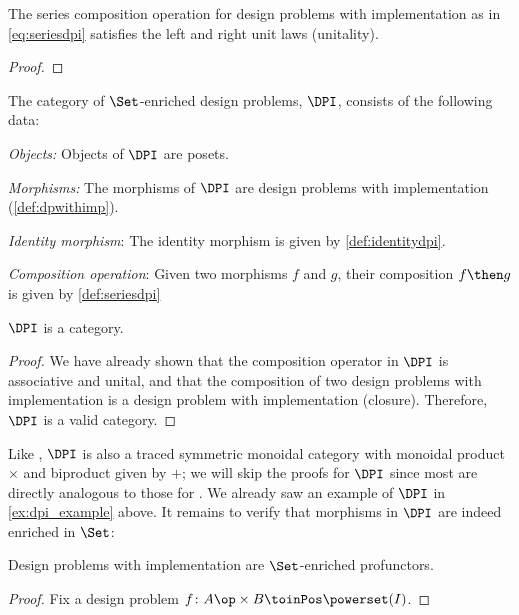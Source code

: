 \begin{lemma}
The series composition operation for design problems with implementation as in \cref{eq:seriesdpi} satisfies the left and right unit laws (unitality).
\end{lemma}

\begin{proof}
\end{proof}


\begin{definition}
The category of $\Set$-enriched design problems, $\DPI$, consists of the following data:
\begin{compactenum}
\item \emph{Objects:}  Objects of $\DPI$ are posets.
\item \emph{Morphisms:} The morphisms of $\DPI$ are design problems with implementation (\cref{def:dpwithimp}).
\item \emph{Identity morphism}: The identity morphism is given by \cref{def:identitydpi}.
\item \emph{Composition operation}: Given two morphisms $f$ and $g$, their composition $f\then g$ is given by \cref{def:seriesdpi}
\end{compactenum}
\end{definition}

\begin{lemma}
$\DPI$ is a category.
\end{lemma}

\begin{proof}
We have already shown that the composition operator in $\DPI$ is associative and unital, and that the composition of two design problems with implementation is a design problem with implementation (closure). Therefore, $\DPI$ is a valid category.
\end{proof}

Like \DP, $\DPI$ is also a traced symmetric monoidal category with monoidal product $\times$ and biproduct given by $+$; we will skip the proofs for $\DPI$ since most are directly analogous to those for \DP. We already saw an example of $\DPI$ in \cref{ex:dpi_example} above. It remains to verify that morphisms in $\DPI$ are indeed enriched in $\Set$:

\begin{proposition}
Design problems with implementation are $\Set$-enriched profunctors.
\end{proposition}
\begin{proof}
Fix a design problem $f \colon A\op \times B \toinPos \powerset(I)$.
\end{proof}

